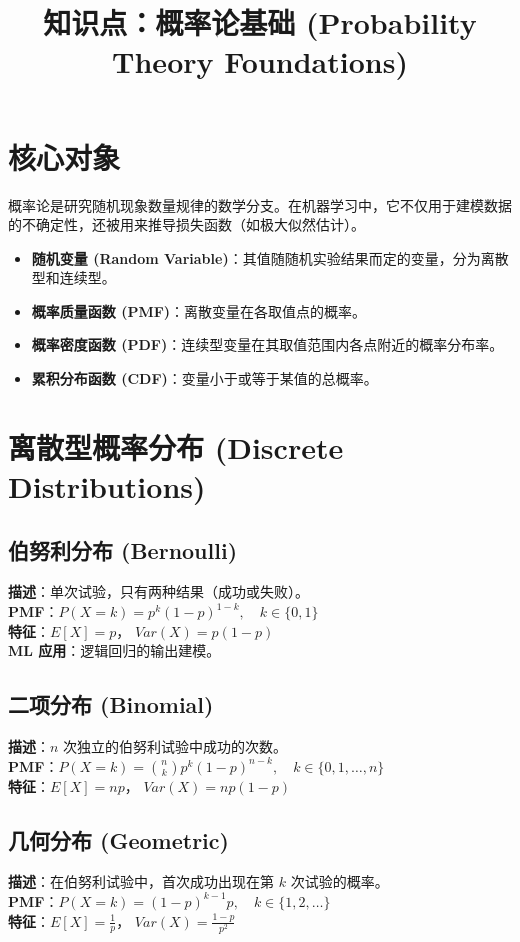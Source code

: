 \documentclass[12pt, a4paper]{article}
\title{知识点：概率论基础 (Probability Theory Foundations)}
\author{}
\date{}
\begin{document}
\maketitle

\section{核心对象}
概率论是研究随机现象数量规律的数学分支。在机器学习中，它不仅用于建模数据的不确定性，还被用来推导损失函数（如极大似然估计）。
\begin{itemize}
    \item \textbf{随机变量 (Random Variable)}：其值随随机实验结果而定的变量，分为离散型和连续型。
    \item \textbf{概率质量函数 (PMF)}：离散变量在各取值点的概率。
    \item \textbf{概率密度函数 (PDF)}：连续型变量在其取值范围内各点附近的概率分布率。
    \item \textbf{累积分布函数 (CDF)}：变量小于或等于某值的总概率。
\end{itemize}

\section{离散型概率分布 (Discrete Distributions)}

\subsection{伯努利分布 (Bernoulli)}
\textbf{描述}：单次试验，只有两种结果（成功或失败）。
\\ \textbf{PMF}：$P(X=k) = p^k(1-p)^{1-k}, \quad k \in \{0, 1\}$
\\ \textbf{特征}：$E[X] = p$， $Var(X) = p(1-p)$
\\ \textbf{ML 应用}：逻辑回归的输出建模。

\subsection{二项分布 (Binomial)}
\textbf{描述}：$n$ 次独立的伯努利试验中成功的次数。
\\ \textbf{PMF}：$P(X=k) = \binom{n}{k} p^k(1-p)^{n-k}, \quad k \in \{0, 1, \dots, n\}$
\\ \textbf{特征}：$E[X] = np$， $Var(X) = np(1-p)$

\subsection{几何分布 (Geometric)}
\textbf{描述}：在伯努利试验中，首次成功出现在第 $k$ 次试验的概率。
\\ \textbf{PMF}：$P(X=k) = (1-p)^{k-1}p, \quad k \in \{1, 2, \dots\}$
\\ \textbf{特征}：$E[X] = \frac{1}{p}$， $Var(X) = \frac{1-p}{p^2}$
\end{document}
